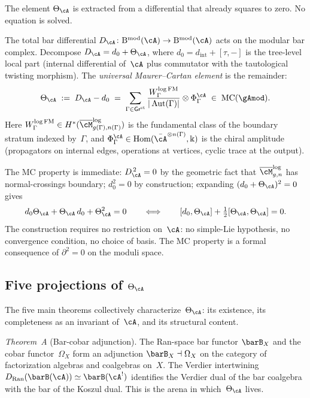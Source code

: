 The element $\Theta_\cA$ is extracted from a differential that
already squares to zero. No equation is solved.

The total bar differential
$D_\cA\colon\mathrm{B}^{\mathrm{mod}}(\cA)\to
\mathrm{B}^{\mathrm{mod}}(\cA)$ acts on the modular bar complex.
Decompose $D_\cA=d_0+\Theta_\cA$, where
$d_0=d_{\mathrm{int}}+[\tau,-]$ is the tree-level local part
(internal differential of~$\cA$ plus commutator with the
tautological twisting morphism). The \emph{universal
Maurer--Cartan element} is the remainder:
\begin{equation}\label{eq:pref-theta}
\Theta_\cA
\;:=\;
D_\cA-d_0
\;=\;
\sum_{\Gamma\in\mathsf{Gr}^{\mathrm{st}}}
\frac{W^{\log\mathrm{FM}}_\Gamma}{|\operatorname{Aut}(\Gamma)|}
\otimes\Phi^\cA_\Gamma
\;\in\;
\operatorname{MC}(\gAmod).
\end{equation}
Here $W^{\log\mathrm{FM}}_\Gamma\in
H^*(\overline{\cM}^{\log}_{g(\Gamma),n(\Gamma)})$ is the
fundamental class of the boundary stratum indexed by~$\Gamma$,
and $\Phi^\cA_\Gamma\in\operatorname{Hom}(\bar\cA^{\otimes
n(\Gamma)},\Bbbk)$ is the chiral amplitude
(propagators on internal edges, operations at vertices,
cyclic trace at the output).

The MC property is immediate: $D_\cA^{\,2}=0$ by the geometric
fact that $\overline{\cM}_{g,n}^{\log}$ has normal-crossings
boundary; $d_0^2=0$ by construction; expanding
$(d_0+\Theta_\cA)^2=0$ gives
\[
d_0\Theta_\cA+\Theta_\cA\,d_0
+\Theta_\cA^2=0
\qquad\Longleftrightarrow\qquad
[d_0,\Theta_\cA]+\tfrac12[\Theta_\cA,\Theta_\cA]=0.
\]
The construction requires no restriction on~$\cA$: no
simple-Lie hypothesis, no convergence condition, no choice of
basis. The MC property is a formal consequence of $\partial^2=0$
on the moduli space.

\subsection*{Five projections of $\Theta_\cA$}

The five main theorems collectively characterize~$\Theta_\cA$:
its existence, its completeness as an invariant of~$\cA$,
and its structural content.

\smallskip

\emph{Theorem~A} (Bar-cobar adjunction).
The Ran-space bar functor $\barB_X$ and the cobar
functor~$\Omega_X$ form an adjunction
$\barB_X\dashv\Omega_X$ on the category of factorization
algebras and coalgebras on~$X$.
The Verdier intertwining $D_{\mathrm{Ran}}(\barB(\cA))\simeq
\barB(\cA^!)$ identifies the Verdier dual of the bar coalgebra
with the bar of the Koszul dual.
This is the arena in which~$\Theta_\cA$ lives.

